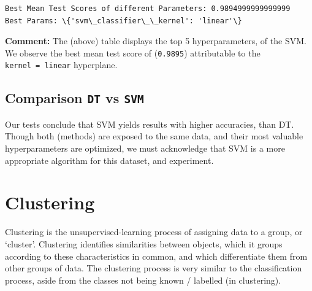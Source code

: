 \documentclass[11pt]{article}
\begin{document}
    \begin{Verbatim}[commandchars=\\\{\}]
Best Mean Test Scores of different Parameters: 0.9894999999999999
Best Params: \{'svm\_classifier\_\_kernel': 'linear'\}
    \end{Verbatim}

    \textbf{Comment:} The (above) table displays the top 5 hyperparameters,
of the SVM. We observe the best mean test score of (\texttt{0.9895})
attributable to the \texttt{kernel\ =\ linear} hyperplane.

    \hypertarget{comparison-dt-vs-svm}{%
\subsection{\texorpdfstring{Comparison \texttt{DT} vs
\texttt{SVM}}{Comparison DT vs SVM}}\label{comparison-dt-vs-svm}}

Our tests conclude that SVM yields results with higher accuracies, than
DT. Though both (methods) are exposed to the same data, and their most
valuable hyperparameters are optimized, we must acknowledge that SVM is
a more appropriate algorithm for this dataset, and experiment.

    \hypertarget{clustering}{%
\section{Clustering}\label{clustering}}

Clustering is the unsupervised-learning process of assigning data to a
group, or `cluster'. Clustering identifies similarities between objects,
which it groups according to these characteristics in common, and which
differentiate them from other groups of data. The clustering process is
very similar to the classification process, aside from the classes not
being known / labelled (in clustering).
\end{document}
